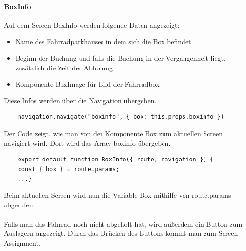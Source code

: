 \paragraph{BoxInfo}
Auf dem Screen BoxInfo werden folgende Daten angezeigt:\\
\begin{itemize}
    \item Name des Fahrradparkhauses in dem sich die Box befindet
    \item Beginn der Buchung und falls die Buchung in der Vergangenheit liegt, zusätzlich die Zeit der Abholung
    \item Komponente BoxImage für Bild der Fahrradbox
\end{itemize}
Diese Infos werden über die Navigation übergeben.\\
\begin{verbatim}
    navigation.navigate("boxinfo", { box: this.props.boxinfo })
\end{verbatim}
Der Code zeigt, wie man von der Komponente Box zum aktuellen Screen navigiert wird. Dort wird das Array boxinfo übergeben.\\
\begin{verbatim}
    export default function BoxInfo({ route, navigation }) {
    const { box } = route.params;
    ...}
\end{verbatim}
Beim aktuellen Screen wird nun die Variable Box mithilfe von route.params abgerufen. \\ \\
Falls man das Fahrrad noch nicht abgeholt hat, wird außerdem ein Button zum Auslagern angezeigt. Durch das Drücken des Buttons kommt man zum Screen Assignment.\\
